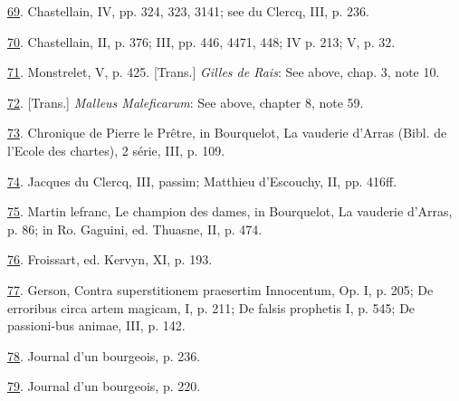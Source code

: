 \protect\hypertarget{23_NOTES.xhtmlux5cux23id_497}{\protect\hyperlink{18_Chapter_Eleven__THE_FORMS_OF_THO.xhtmlux5cux23id_496}{69}}.
Chastellain, IV, pp. 324, 323, 3141; see du Clercq, III, p. 236.

\protect\hypertarget{23_NOTES.xhtmlux5cux23id_495}{\protect\hyperlink{18_Chapter_Eleven__THE_FORMS_OF_THO.xhtmlux5cux23id_494}{70}}.
Chastellain, II, p. 376; III, pp. 446, 4471, 448; IV p. 213; V, p. 32.

\protect\hypertarget{23_NOTES.xhtmlux5cux23id_493}{\protect\hyperlink{18_Chapter_Eleven__THE_FORMS_OF_THO.xhtmlux5cux23id_492}{71}}.
Monstrelet, V, p. 425. {[}Trans.{]} \emph{Gilles de Rais}: See above,
chap. 3, note 10.

\protect\hypertarget{23_NOTES.xhtmlux5cux23id_491}{\protect\hyperlink{18_Chapter_Eleven__THE_FORMS_OF_THO.xhtmlux5cux23id_490}{72}}.
{[}Trans.{]} \emph{Malleus Maleficarum}: See above, chapter 8, note 59.

\protect\hypertarget{23_NOTES.xhtmlux5cux23id_489}{\protect\hyperlink{18_Chapter_Eleven__THE_FORMS_OF_THO.xhtmlux5cux23id_488}{73}}.
Chronique de Pierre le Prêtre, in Bourquelot, La vauderie d'Arras (Bibl.
de l'Ecole des chartes), 2 série, III, p. 109.

\protect\hypertarget{23_NOTES.xhtmlux5cux23id_487}{\protect\hyperlink{18_Chapter_Eleven__THE_FORMS_OF_THO.xhtmlux5cux23id_486}{74}}.
Jacques du Clercq, III, passim; Matthieu d'Escouchy, II, pp. 416ff.

\protect\hypertarget{23_NOTES.xhtmlux5cux23id_485}{\protect\hyperlink{18_Chapter_Eleven__THE_FORMS_OF_THO.xhtmlux5cux23id_484}{75}}.
Martin lefranc, Le champion des dames, in Bourquelot, La vauderie
d'Arras, p. 86; in Ro. Gaguini, ed. Thuasne, II, p. 474.

\protect\hypertarget{23_NOTES.xhtmlux5cux23id_483}{\protect\hyperlink{18_Chapter_Eleven__THE_FORMS_OF_THO.xhtmlux5cux23id_482}{76}}.
Froissart, ed. Kervyn, XI, p. 193.

\protect\hypertarget{23_NOTES.xhtmlux5cux23id_481}{\protect\hyperlink{18_Chapter_Eleven__THE_FORMS_OF_THO.xhtmlux5cux23id_480}{77}}.
Gerson, Contra superstitionem praesertim Innocentum, Op. I, p. 205; De
erroribus circa artem magicam, I, p. 211; De falsis prophetis I, p. 545;
De passioni-bus animae, III, p. 142.

\protect\hypertarget{23_NOTES.xhtmlux5cux23id_479}{\protect\hyperlink{18_Chapter_Eleven__THE_FORMS_OF_THO.xhtmlux5cux23id_478}{78}}.
Journal d'un bourgeois, p. 236.

\protect\hypertarget{23_NOTES.xhtmlux5cux23id_477}{\protect\hyperlink{18_Chapter_Eleven__THE_FORMS_OF_THO.xhtmlux5cux23id_476}{79}}.
Journal d'un bourgeois, p. 220.

